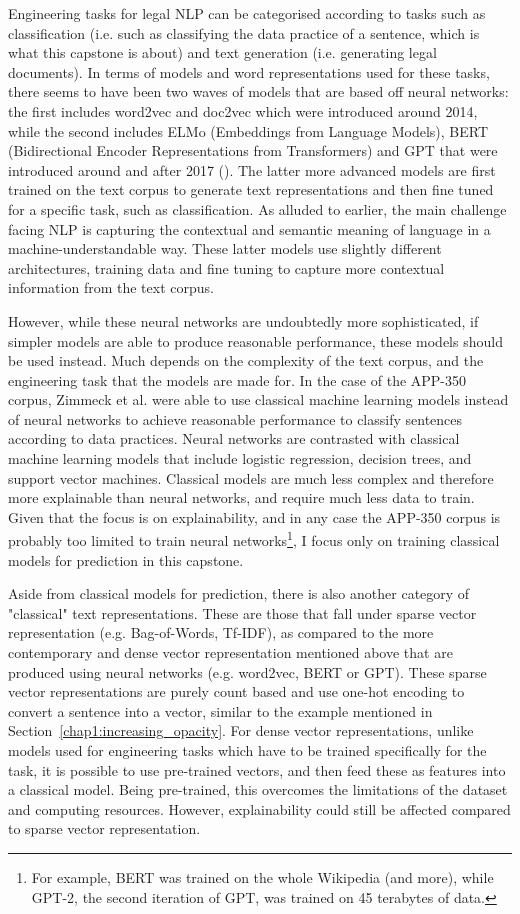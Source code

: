 Engineering tasks for legal NLP can be categorised according to tasks such as classification (i.e. such as classifying the data practice of a sentence, which is what this capstone is about) and text generation (i.e. generating legal documents). In terms of models and word representations used for these tasks, there seems to have been two waves of models that are based off neural networks: the first includes word2vec and doc2vec which were introduced around 2014, while the second includes ELMo (Embeddings from Language Models), BERT (Bidirectional Encoder Representations from Transformers) and GPT that were introduced around and after 2017 (\cite{katz_nlp_legal}). The latter more advanced models are first trained on the text corpus to generate text representations and then fine tuned for a specific task, such as classification. As alluded to earlier, the main challenge facing NLP is capturing the contextual and semantic meaning of language in a machine-understandable way. These latter models use slightly different architectures, training data and fine tuning to capture more contextual information from the text corpus.

However, while these neural networks are undoubtedly more sophisticated, if simpler models are able to produce reasonable performance, these models should be used instead. Much depends on the complexity of the text corpus, and the engineering task that the models are made for. In the case of the APP-350 corpus, Zimmeck et al. were able to use classical machine learning models instead of neural networks to achieve reasonable performance to classify sentences according to data practices. Neural networks are contrasted with classical machine learning models that include logistic regression, decision trees, and support vector machines. Classical models are much less complex and therefore more explainable than neural networks, and require much less data to train. Given that the focus is on explainability, and in any case the APP-350 corpus is probably too limited to train neural networks\footnote{For example, BERT was trained on the whole Wikipedia (and more), while GPT-2, the second iteration of GPT, was trained on 45 terabytes of data.}, I focus only on training classical models for prediction in this capstone.

Aside from classical models for prediction, there is also another category of "classical" text representations. These are those that fall under sparse vector representation (e.g. Bag-of-Words, Tf-IDF), as compared to the more contemporary and dense vector representation mentioned above that are produced using neural networks (e.g. word2vec, BERT or GPT). These sparse vector representations are purely count based and use one-hot encoding to convert a sentence into a vector, similar to the example mentioned in Section~\ref{chap1:increasing_opacity}. For dense vector representations, unlike models used for engineering tasks which have to be trained specifically for the task, it is possible to use pre-trained vectors, and then feed these as features into a classical model. Being pre-trained, this overcomes the limitations of the dataset and computing resources. However, explainability could still be affected compared to sparse vector representation.


